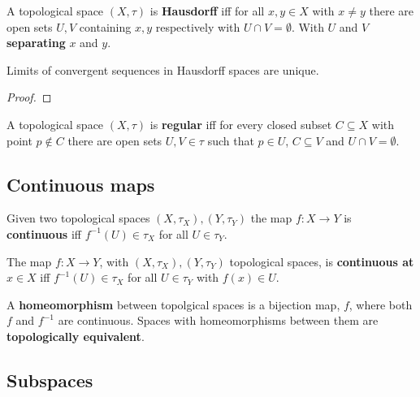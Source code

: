 \documentclass[../Year2.tex]{subfiles}
\begin{document}
\begin{definition}[Hausdorff]
    A topological space $(X,\tau)$ is \textbf{Hausdorff} iff for all $x,y\in X$ with $x\neq y$ there are open sets $U,V$ containing $x,y$ respectively with $U\cap V=\emptyset$. With $U$ and $V$ \textbf{separating} $x$ and $y$.
\end{definition}

\begin{theorem}
    Limits of convergent sequences in Hausdorff spaces are unique.
    \begin{proof}
        
    \end{proof}
\end{theorem}

\begin{definition}
    A topological space $(X,\tau)$ is \textbf{regular} iff for every closed subset $C\subseteq X$ with point $p\not\in C$ there are open sets $U,V\in\tau$ such that $p\in U$, $C\subseteq V$ and $U\cap V=\emptyset$.
\end{definition}

\subsection{Continuous maps}

\begin{definition}
    Given two topological spaces $(X,\tau_X),(Y,\tau_Y)$ the map $f:X\rightarrow Y$ is \textbf{continuous} iff $f^{-1}(U)\in\tau_X$ for all $U\in\tau_Y$.
\end{definition}

\begin{definition}
    The map $f:X\rightarrow Y$, with $(X,\tau_X),(Y,\tau_Y)$ topological spaces, is \textbf{continuous at} $x\in X$ iff $f^{-1}(U)\in\tau_X$ for all $U\in\tau_Y$ with $f(x)\in U$.
\end{definition}

\begin{definition}[Homeomorphism]
    A \textbf{homeomorphism} between topolgical spaces is a bijection map, $f$, where both $f$ and $f^{-1}$ are continuous. Spaces with homeomorphisms between them are \textbf{topologically equivalent}.
\end{definition}

\subsection{Subspaces}
\end{document}

